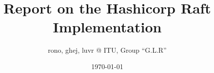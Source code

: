 \documentclass[a4paper,11pt]{article}
\title{Report on the Hashicorp Raft Implementation}
\author{rono, ghej, luvr @ ITU, Group ``G.L.R''}
\date{\today}
\begin{document}
\maketitle

\tableofcontents

\pagebreak
\end{document}
